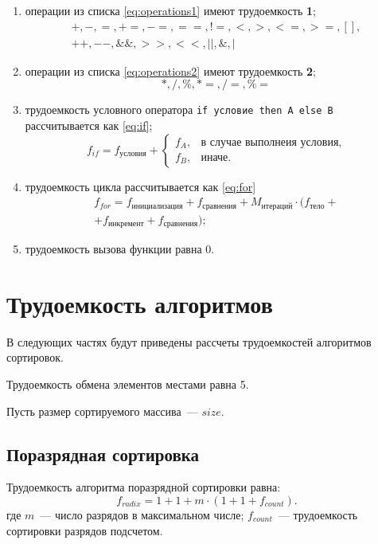 \begin{enumerate}
	\item операции из списка \ref{eq:operations1} имеют трудоемкость \textbf{1};
	\begin{equation}
		\label{eq:operations1}
		\begin{gathered}
			+, -, =, +=, -=, ==, !=, <, >, <=, >=, [], \\ ++, --, \&\&, >>, <<, ||, \&, |
		\end{gathered}
	\end{equation}
	\item операции из списка \ref{eq:operations2} имеют трудоемкость \textbf{2};
	\begin{equation}
		\label{eq:operations2}
		*, /, \%, *=, /=, \%=
	\end{equation}
	\item трудоемкость условного оператора \texttt{if условие then A else B} рассчитывается как \ref{eq:if};
	\begin{equation}
		\label{eq:if}
		f_{if} = f_{\text{условия}} + 
		\begin{cases}
			f_{A}, & \text{в случае выполнеия условия,}\\
			f_{B}, & \text{иначе}.
		\end{cases}
	\end{equation}
	\item трудоемкость цикла рассчитывается как \ref{eq:for}
	\begin{equation}
		\label{eq:for}
		\begin{gathered}
			f_{for} = f_{\text{инициализация}} + f_{\text{сравнения}} + M_{\text{итераций}} \cdot (f_{\text{тело}} +\\
			+ f_{\text{инкремент}} + f_{\text{сравнения}});
		\end{gathered}
	\end{equation}
	\item трудоемкость вызова функции равна 0.
\end{enumerate}

\section{Трудоемкость алгоритмов}
В следующих частях будут приведены рассчеты трудоемкостей алгоритмов сортировок.

Трудоемкость обмена элементов местами равна 5.

Пусть размер сортируемого массива~--- $size$.

\subsection*{Поразрядная сортировка}
Трудоемкость алгоритма поразрядной сортировки равна:
\begin{equation}
	f_{radix} = 1 + 1 + m \cdot (1 + 1 + f_{count}).
\end{equation}
где $m$~--- число разрядов в максимальном числе;
$f_{count}$~--- трудоемкость сортировки разрядов подсчетом.

